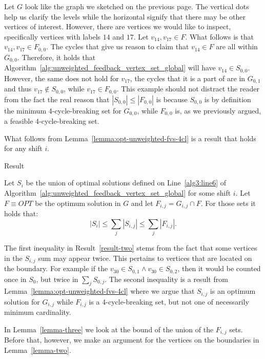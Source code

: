  Let $G$ look like the graph we sketched on the previous page. The vertical dots help us 
clarify the levels while the horizontal signify that there may be other vertices of interest. However, 
there are vertices we would like to inspect, specifically vertices with labels $14$ and $17$. Let 
$v_{14}, v_{17} \in F$. What follows is that $v_{14}, v_{17} \in F_{0, 0}$. The cycles that give us
reason to claim that $v_{14} \in F$ are all within $G_{0, 0}$. Therefore, it holds that
Algorithm~\ref{alg:unweighted_feedback_vertex_set_global} will have $v_{14} \in S_{0, 0}$. However, the same does not hold for 
$v_{17}$, the cycles that it is a part of are in $G_{0, 1}$ and thus $v_{17} \notin S_{0, 0}$, while 
$v_{17} \in F_{0, 0}$. This example should not distract the reader from the fact the real reason 
that $|S_{0, 0}| \leq |F_{0, 0}|$ is because $S_{0, 0}$ is by definition the minimum 4-cycle-breaking 
set for $G_{0, 0}$, while $F_{0, 0}$ is, as we previously argued, a feasible 4-cycle-breaking set.

 What follows from Lemma~\ref{lemma:opt-unweighted-fvs-4cl} is a result that holds for any shift $i$.

\begin{mydefinition}{Result}
    \label{result-two}

    Let $S_i$ be the union of optimal solutions defined on Line~\ref{alg3:line6} of Algorithm~\ref{alg:unweighted_feedback_vertex_set_global} 
    for some shift $i$. 
    Let $F \equiv OPT$ be the optimum solution in $G$ and let $F_{i, j} = G_{i, j} \cap F$.
    For those sets it holds that: \[|S_{i}| \leq \sum\limits_{j} |S_{i, j}| \leq \sum\limits_{j} |F_{i, j}|\text{.}\]  

\end{mydefinition}

 The first inequality in Result~\ref{result-two} stems from the fact that some vertices 
in the $S_{i, j}$ sum may appear twice. This pertains to vertices that are located on the boundary. 
For example if the $v_{30} \in S_{0, 1} \wedge v_{30} \in S_{0, 2}$, then it would be counted once in 
$S_0$, but twice in $\sum\limits_j S_{0,j}$.
The second inequality is a result from Lemma~\ref{lemma:opt-unweighted-fvs-4cl} 
where we argue that $S_{i, j}$ is an optimum solution for $G_{i, j}$ while $F_{i, j}$ is a 
4-cycle-breaking set, but not one of necessarily minimum cardinality. 

 In Lemma~\ref{lemma-three} we look at the bound of the union of the $F_{i, j}$ sets. 
Before that, however, we make an argument for the vertices on the boundaries in Lemma~\ref{lemma-two}. 

